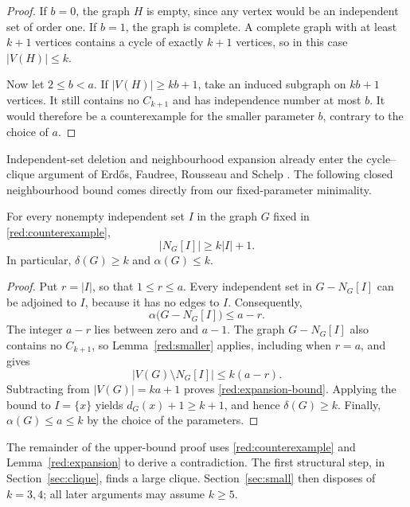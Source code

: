 \begin{proof}
If $b=0$, the graph $H$ is empty, since any vertex would be an
independent set of order one. If $b=1$, the graph is complete. A
complete graph with at least $k+1$ vertices contains a cycle of exactly
$k+1$ vertices, so in this case $|V(H)|\le k$.

Now let $2\le b<a$. If $|V(H)|\ge kb+1$, take an induced subgraph on
$kb+1$ vertices. It still contains no $C_{k+1}$ and has independence
number at most $b$. It would therefore be a counterexample for the
smaller parameter $b$, contrary to the choice of $a$.
\end{proof}

Independent-set deletion and neighbourhood expansion already enter the
cycle--clique argument of Erd\H{o}s, Faudree, Rousseau and Schelp
\cite[Section~3]{ErdosFaudreeRousseauSchelp1978}. The following closed
neighbourhood bound comes directly from our fixed-parameter minimality.

\begin{lemma}\label{red:expansion}
For every nonempty independent set $I$ in the graph $G$ fixed in
\eqref{red:counterexample},
\begin{equation}
  |N_G[I]|\ge k|I|+1.
  \label{red:expansion-bound}
\end{equation}
In particular, $\delta(G)\ge k$ and $\alpha(G)\le k$.
\end{lemma}

\begin{proof}
Put $r=|I|$, so that $1\le r\le a$. Every independent set in
$G-N_G[I]$ can be adjoined to $I$, because it has no edges to $I$.
Consequently,
\[
  \alpha\bigl(G-N_G[I]\bigr)\le a-r.
\]
The integer $a-r$ lies between zero and $a-1$. The graph
$G-N_G[I]$ also contains no $C_{k+1}$, so Lemma~\ref{red:smaller}
applies, including when $r=a$, and gives
\[
  |V(G)\setminus N_G[I]|\le k(a-r).
\]
Subtracting from $|V(G)|=ka+1$ proves
\eqref{red:expansion-bound}. Applying the bound to $I=\{x\}$ yields
$d_G(x)+1\ge k+1$, and hence $\delta(G)\ge k$. Finally,
$\alpha(G)\le a\le k$ by the choice of the parameters.
\end{proof}

The remainder of the upper-bound proof uses
\eqref{red:counterexample} and Lemma~\ref{red:expansion} to derive a
contradiction. The first structural step, in
Section~\ref{sec:clique}, finds a large clique. Section~\ref{sec:small}
then disposes of $k=3,4$; all later arguments may assume $k\ge5$.
